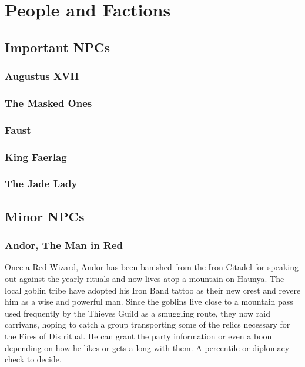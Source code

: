 \section{People and Factions}
	
	\subsection{Important NPCs}

		\subsubsection{Augustus XVII}

		\subsubsection{The Masked Ones}

		\subsubsection{Faust}
			
		\subsubsection{King Faerlag}

		\subsubsection{The Jade Lady}

	\subsection{Minor NPCs}

		\subsubsection{Andor, The Man in Red}

		Once a Red Wizard, Andor has been banished from the Iron Citadel
		for speaking out against the yearly rituals and now lives atop
		a mountain on Haunya.  The local goblin tribe have adopted his
		Iron Band tattoo as their new crest and revere him as a wise 
		and powerful man.  Since the goblins live close to a mountain
		pass used frequently by the Thieves Guild as a smuggling route,
		they now raid carrivans, hoping to catch a group transporting
		some of the relics necessary for the Fires of Dis ritual.  He
		can grant the party information or even a boon depending on how
		he likes or gets a long with them.  A percentile or diplomacy 
		check to decide. 


